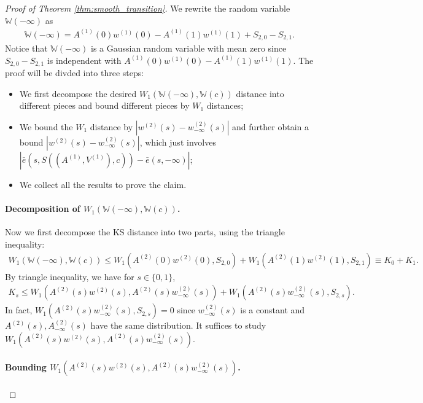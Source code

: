 \documentclass[12pt]{article}
\begin{document}
\begin{proof}[Proof of Theorem \ref{thm:smooth_transition}]
	We rewrite the random variable $\mathbb{W}(-\infty)$ as 
	\begin{align*}
		\mathbb{W}(-\infty)= A^{(1)}(0) w^{(1)}(0)-A^{(1)}(1)  w^{(1)}(1)+ S_{2,0} - S_{2,1}.
	\end{align*}
	Notice that $\mathbb{W}(-\infty)$ is a Gaussian random variable with mean zero since $S_{2,0}-S_{2,1}$ is independent with $A^{(1)}(0) w^{(1)}(0)-A^{(1)}(1) w^{(1)}(1)$. The proof will be divded into three steps:
	\begin{itemize}
		\item We first decompose the desired $W_1(\mathbb{W}(-\infty),\mathbb{W}(c))$ distance into different pieces and bound different pieces by $W_1$ distances; 
		\item We bound the $W_1$ distance by $| w^{(2)}(s)- w_{-\infty}^{(2)}(s)|$ and further obtain a bound $| w^{(2)}(s)- w_{-\infty}^{(2)}(s)|$, which just involves $|\bar e(s, S((A^{(1)},V^{(1)}),c))-\bar e(s, -\infty)|$; 
		\item We collect all the results to prove the claim.
	\end{itemize}
	

	\paragraph{Decomposition of $W_1(\mathbb{W}(-\infty),\mathbb{W}(c))$.}
	
	
	Now we first decompose the KS distance into two parts, using the triangle inequality:
	\begin{align*}
		W_1(\mathbb{W}(-\infty),\mathbb{W}(c))\leq W_1(A^{(2)}(0) w^{(2)}(0),S_{2,0})+W_1(A^{(2)}(1) w^{(2)}(1),S_{2,1})\equiv K_0+K_1.
	\end{align*}
	By triangle inequality, we have for $s\in\{0,1\}$,
	\begin{align*}
		K_s\leq W_1(A^{(2)}(s)w^{(2)}(s),A^{(2)}(s) w_{-\infty}^{(2)}(s))+W_1(A^{(2)}(s) w_{-\infty}^{(2)}(s),S_{2,s}).
	\end{align*}
	In fact, $W_1(A^{(2)}(s)w_{-\infty}^{(2)}(s),S_{2,s})=0$ since $w_{-\infty}^{(2)}(s)$ is a constant and $A^{(2)}(s), A_{-\infty}^{(2)}(s)$ have the same distribution. It suffices to study $W_1(A^{(2)}(s)w^{(2)}(s),A^{(2)}(s)w_{-\infty}^{(2)}(s))$. 

	\paragraph{Bounding $W_1(A^{(2)}(s)w^{(2)}(s),A^{(2)}(s)w_{-\infty}^{(2)}(s))$.}


\end{proof}
\end{document}

